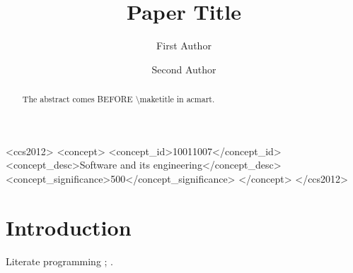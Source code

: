 \documentclass[sigconf]{acmart}
\begin{document}
\title{Paper Title}
\author{First Author}
\author{Second Author}
\begin{abstract}
The abstract comes BEFORE \textbackslash maketitle in acmart.
\end{abstract}
\begin{CCSXML}
<ccs2012>
<concept>
<concept_id>10011007</concept_id>
<concept_desc>Software and its engineering</concept_desc>
<concept_significance>500</concept_significance>
</concept>
</ccs2012>
\end{CCSXML}
\maketitle
\section{Introduction}
Literate programming \cite{knuth1984literate}; \citet{lamport1994latex}.


\end{document}
